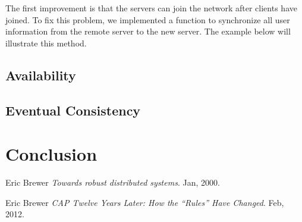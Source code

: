 \documentclass[10pt,twocolumn]{article}
\begin{document}
The first improvement is that the servers can join the network after clients have joined. To fix this problem, we implemented a function to synchronize all user information from the remote server to the new server. The example below will illustrate this method.



	\subsection{Availability}

	\subsection{Eventual Consistency}

\section{Conclusion}

%
%
%
%



\begin{thebibliography}{9}
Eric Brewer
\textit{Towards robust distributed systems}. Jan, 2000.

Eric Brewer
\textit{CAP Twelve Years Later: How the “Rules” Have Changed}. Feb, 2012.
\end{thebibliography}
\end{document}
